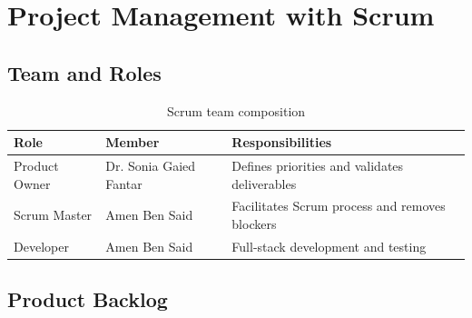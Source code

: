\documentclass[12pt,a4paper,oneside]{report}
\begin{document}
\section{Project Management with Scrum}

\subsection{Team and Roles}

\begin{table}[H]
\centering
\caption{Scrum team composition}
\label{tab:scrum_team}
\begin{tabular}{|p{3.5cm}|p{4cm}|p{5.5cm}|}
\hline
\textbf{Role} & \textbf{Member} & \textbf{Responsibilities} \\
\hline
Product Owner & Dr. Sonia Gaied Fantar & Defines priorities and validates deliverables \\
\hline
Scrum Master & Amen Ben Said & Facilitates Scrum process and removes blockers \\
\hline
Developer & Amen Ben Said & Full-stack development and testing \\
\hline
\end{tabular}
\end{table}

\subsection{Product Backlog}
\end{document}
